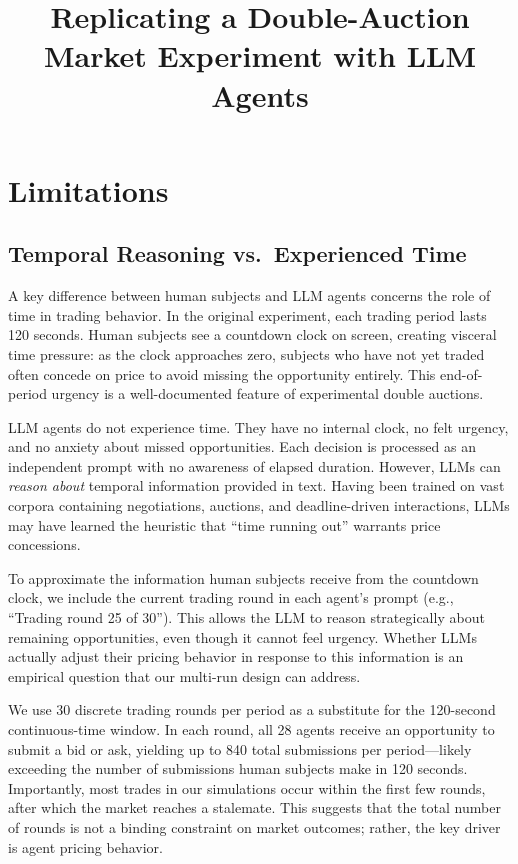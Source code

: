 \documentclass[12pt]{article}
\title{Replicating a Double-Auction Market Experiment with LLM Agents}
\author{}
\date{}
\begin{document}
\maketitle

\section{Limitations}

\subsection{Temporal Reasoning vs.\ Experienced Time}

A key difference between human subjects and LLM agents concerns the role of time in trading behavior. In the original experiment, each trading period lasts 120 seconds. Human subjects see a countdown clock on screen, creating visceral time pressure: as the clock approaches zero, subjects who have not yet traded often concede on price to avoid missing the opportunity entirely. This end-of-period urgency is a well-documented feature of experimental double auctions.

LLM agents do not experience time. They have no internal clock, no felt urgency, and no anxiety about missed opportunities. Each decision is processed as an independent prompt with no awareness of elapsed duration. However, LLMs can \textit{reason about} temporal information provided in text. Having been trained on vast corpora containing negotiations, auctions, and deadline-driven interactions, LLMs may have learned the heuristic that ``time running out'' warrants price concessions.

To approximate the information human subjects receive from the countdown clock, we include the current trading round in each agent's prompt (e.g., ``Trading round 25 of 30''). This allows the LLM to reason strategically about remaining opportunities, even though it cannot feel urgency. Whether LLMs actually adjust their pricing behavior in response to this information is an empirical question that our multi-run design can address.

We use 30 discrete trading rounds per period as a substitute for the 120-second continuous-time window. In each round, all 28 agents receive an opportunity to submit a bid or ask, yielding up to 840 total submissions per period---likely exceeding the number of submissions human subjects make in 120 seconds. Importantly, most trades in our simulations occur within the first few rounds, after which the market reaches a stalemate. This suggests that the total number of rounds is not a binding constraint on market outcomes; rather, the key driver is agent pricing behavior.
\end{document}

